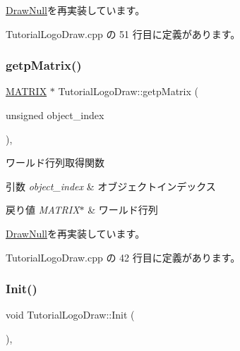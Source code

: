 \mbox{\hyperlink{class_draw_null_a0c1efe55fea325ad277594be6fe1e938}{Draw\+Null}}を再実装しています。



 Tutorial\+Logo\+Draw.\+cpp の 51 行目に定義があります。

\mbox{\label{class_tutorial_logo_draw_aade531190180c385c266f5698f99735d}} 
\subsubsection{\texorpdfstring{getp\+Matrix()}{getpMatrix()}}
{\footnotesize\ttfamily \mbox{\hyperlink{_matrix_8h_a032295cd9fb1b711757c90667278e744}{M\+A\+T\+R\+IX}} $\ast$ Tutorial\+Logo\+Draw\+::getp\+Matrix (\begin{DoxyParamCaption}\item[{unsigned}]{object\+\_\+index }\end{DoxyParamCaption})\hspace{0.3cm}{\ttfamily [override]}, {\ttfamily [virtual]}}



ワールド行列取得関数 


\begin{DoxyParams}{引数}
{\em object\+\_\+index} & オブジェクトインデックス \\
\hline
\end{DoxyParams}

\begin{DoxyRetVals}{戻り値}
{\em M\+A\+T\+R\+I\+X$\ast$} & ワールド行列 \\
\hline
\end{DoxyRetVals}


\mbox{\hyperlink{class_draw_null_a9aac059eb3b5d1f77e8bd3aa0647cff9}{Draw\+Null}}を再実装しています。



 Tutorial\+Logo\+Draw.\+cpp の 42 行目に定義があります。

\mbox{\label{class_tutorial_logo_draw_a53fc4b1b23c7f9e249600be67510f944}} 
\subsubsection{\texorpdfstring{Init()}{Init()}}
{\footnotesize\ttfamily void Tutorial\+Logo\+Draw\+::\+Init (\begin{DoxyParamCaption}{ }\end{DoxyParamCaption})\hspace{0.3cm}{\ttfamily [override]}, {\ttfamily [virtual]}}



